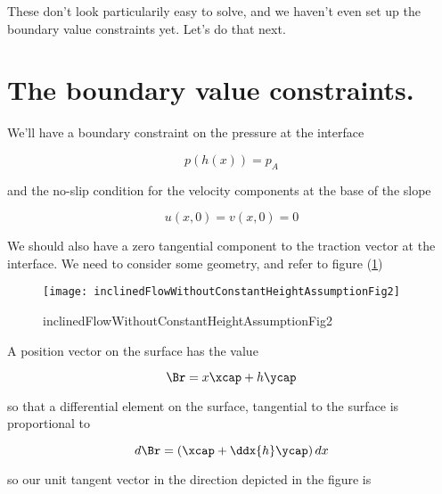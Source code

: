 These don't look particularily easy to solve, and we haven't even set up the boundary value constraints yet.  Let's do that next.

\section{The boundary value constraints.}

We'll have a boundary constraint on the pressure at the interface

\begin{equation}\label{eqn:inclinedFlowWithoutConstantHeightAssumption:n}
p(h(x)) = p_A
\end{equation}

and the no-slip condition for the velocity components at the base of the slope

\begin{equation}\label{eqn:inclinedFlowWithoutConstantHeightAssumption:n}
u(x, 0) = v(x, 0) = 0
\end{equation}

We should also have a zero tangential component to the traction vector at the interface.  We need to consider some geometry, and refer to figure (\ref{fig:inclinedFlowWithoutConstantHeightAssumption:inclinedFlowWithoutConstantHeightAssumptionFig2})

\begin{figure}[htp]
   \centering
   \texttt{[image: inclinedFlowWithoutConstantHeightAssumptionFig2]}
   \caption{inclinedFlowWithoutConstantHeightAssumptionFig2}\label{fig:inclinedFlowWithoutConstantHeightAssumption:inclinedFlowWithoutConstantHeightAssumptionFig2}
\end{figure}

A position vector on the surface has the value

\begin{equation}\label{eqn:inclinedFlowWithoutConstantHeightAssumption:n}
\Br = x \xcap + h \ycap
\end{equation}

so that a differential element on the surface, tangential to the surface is proportional to

\begin{equation}\label{eqn:inclinedFlowWithoutConstantHeightAssumption:n}
d\Br = \left( \xcap + \ddx{h} \ycap \right) dx
\end{equation}

so our unit tangent vector in the direction depicted in the figure is


